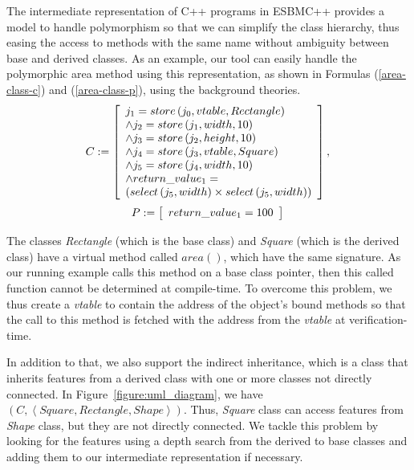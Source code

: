\documentclass[conference]{IEEEtran}
\begin{document}
The intermediate representation of C++ programs in ESBMC++ provides a model
to handle polymorphism so that we can simplify the class hierarchy,
thus easing the access to methods with the same name without ambiguity between
base and derived classes. As an example, our tool can easily handle the polymorphic
area method using this representation, as shown in Formulas (\ref{area-class-c}) and
(\ref{area-class-p}), using the background theories.
%
\begin{equation}
\label{area-class-c}
C := \left [ \begin{array}{ll}
        j_{1} = store\left(j_{0}, vtable, Rectangle\right) \\
        \wedge j_{2} = store\left(j_{1}, width, 10\right) \\
        \wedge j_{3} = store\left(j_{2}, height, 10\right) \\
        \wedge j_{4} = store\left(j_{3}, vtable, Square\right) \\
        \wedge j_{5} = store\left(j_{4}, width, 10\right) \\
        \wedge return\_value_{1} = \\
        \left(select\left(j_{5}, width\right) \times select\left(j_{5}, width\right)\right) \\
              \end{array} \right ],  \\
\end{equation}
%
\begin{equation}
\label{area-class-p}
P := \left [ \begin{array}{ll}
              return\_value_{1} = 100 \\
              \end{array} \right ]  \\
\end{equation}
%

The classes \textit{Rectangle} (which is the base class)
and \textit{Square} (which is the derived class) have a virtual method
called $area\left(\right)$, which have the same signature. As our running example
calls this method on a base class pointer, then this called function
cannot be determined at compile-time. To overcome this problem,
we thus create a \textit{vtable} to contain the address of the object's bound
methods so that the call to this method is fetched with the address from
the \textit{vtable} at verification-time.

In addition to that, we also support the indirect inheritance,
which is a class that inherits features from a derived class with one
or more classes not directly connected. In Figure~\ref{figure:uml_diagram}, we have
$\left(C, \left\langle Square, Rectangle, Shape \right\rangle \right)$.
Thus, \textit{Square} class can access features from \textit{Shape} class,
but they are not directly connected. We tackle this problem by
looking for the features using a depth search from the derived to base classes
and adding them to our intermediate representation if necessary.
\end{document}
